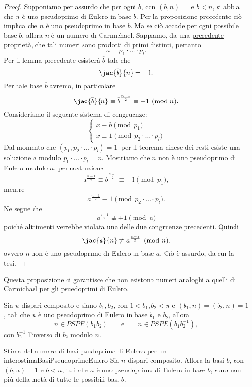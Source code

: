 	\begin{proof}
	Supponiamo per assurdo che per ogni \(b\), con \((b,n)=\) e \(b<n\), si abbia che \(n\) è uno pseudoprimo di Eulero in base \(b\).
	Per la proposizione precedente ciò implica che \(n\) è uno pseudoprimo in base \(b\).
	Ma se ciò accade per ogni possibile base \(b\), allora \(n\) è un numero di Carmichael.
	Sappiamo, da una \hyperref[pr:Carmichael1]{precedente proprietà}, che tali numeri sono prodotti di primi distinti, pertanto
		\[
		n = p_1 \cdot\ldots\cdot p_l.
		\]
	Per il lemma precedente esisterà \(\overline{b}\) tale che
		\[
		\jac{\overline{b}}{n} = -1.
		\]
	Per tale base \(\overline{b}\) avremo, in particolare
		\[
		\jac{\overline{b}}{n} \equiv \overline{b}^{\frac{n-1}{2}} \equiv -1 \pmod{n}.
		\]
	Consideriamo il seguente sistema di congruenze:
		\[
		\begin{cases}
		x \equiv \overline{b} \pmod{p_1}\\
		x \equiv 1 \pmod{p_2 \cdot\ldots\cdot p_l}
		\end{cases}
		\]
	Dal momento che \((p_1, p_2 \cdot\ldots\cdot p_l)=1\), per il teorema cinese dei resti esiste una soluzione \(a\) modulo \(p_1 \cdot\ldots\cdot p_l = n\).
	Mostriamo che \(n\) non è uno pseudoprimo di Eulero modulo \(n\):
	per costruzione
		\[
		a^{\frac{n-1}{2}} \equiv \overline{b}^{\frac{n-1}{2}} \equiv -1 \pmod{p_1},
		\]
	mentre
		\[
		a^{\frac{n-1}{2}} \equiv 1 \pmod{p_2 \cdot\ldots\cdot p_l}.
		\]
	Ne segue che
		\[
		a^{\frac{n-1}{2}} \not\equiv \pm 1 \pmod{n}
		\]
	poiché altrimenti verrebbe violata una delle due congruenze precedenti. Quindi
		\[
		\jac{a}{n} \not\equiv a^{\frac{n-1}{2}} \pmod{n},
		\]
	ovvero \(n\) non è uno pseudoprimo di Eulero in base \(a\). Ciò è assurdo, da cui la tesi.
	\end{proof}

	\begin{oss}
	Questa proposizione ci garantisce che non esistono numeri analoghi a quelli di Carmichael per gli psuedoprimi di Eulero.
	\end{oss}

	\begin{lem}
	Sia \(n\) dispari composito e siano \(b_1,b_2\), con \(1<b_1,b_2<n\) e \((b_1,n)=(b_2,n)=1\), tali che \(n\) è uno pseudoprimo di Eulero in base \(b_1\) e \(b_2\), allora
		\[
		n\in PSPE(b_1 b_2) \qquad\text{e}\qquad n\in PSPE(b_1 b_2^{-1}),
		\]
	con \(b_2^{-1}\) l'inverso di \(b_2\) modulo \(n\).
	\end{lem}

	\begin{prop}{Stima del numero di basi psudoprime di Eulero per un intero}{stimaBasiPseudoprimeEulero}
	Sia \(n\) dispari composito.
	Allora la basi \(b\), con \((b,n)=1\) e \(b<n\), tali che \(n\) è uno pseudoprimo di Eulero in base \(b\), sono non più della metà di tutte le possibili basi \(b\).
	\end{prop}

